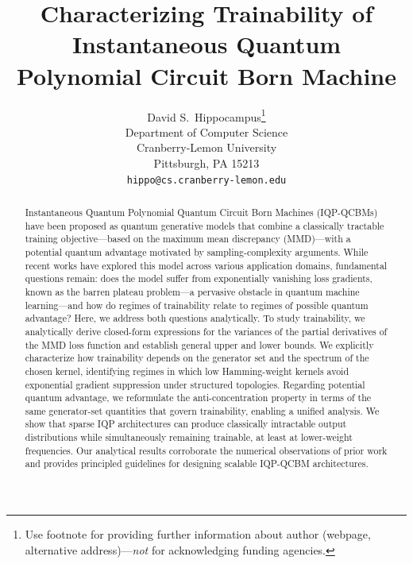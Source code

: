 \documentclass{article}
\title{Characterizing Trainability of Instantaneous Quantum Polynomial Circuit Born Machine}
\author{%
  David S.~Hippocampus\thanks{Use footnote for providing further information
    about author (webpage, alternative address)---\emph{not} for acknowledging
    funding agencies.} \\
  Department of Computer Science\\
  Cranberry-Lemon University\\
  Pittsburgh, PA 15213 \\
  \texttt{hippo@cs.cranberry-lemon.edu} \\
}
\theoremstyle{plain}
\theoremstyle{definition}
\theoremstyle{remark}
\begin{document}
\maketitle


\begin{abstract}
Instantaneous Quantum Polynomial Quantum Circuit Born Machines (IQP-QCBMs) have been proposed as quantum generative models that combine a classically tractable training objective—based on the maximum mean discrepancy (MMD)—with a potential quantum advantage motivated by sampling-complexity arguments. While recent works have explored this model across various application domains, fundamental questions remain: does the model suffer from exponentially vanishing loss gradients, known as the barren plateau problem—a pervasive obstacle in quantum machine learning—and how do regimes of trainability relate to regimes of possible quantum advantage? Here, we address both questions analytically. To study trainability, we analytically derive closed-form expressions for the variances of the partial derivatives of the MMD loss function and establish general upper and lower bounds. We explicitly characterize how trainability depends on the generator set and the spectrum of the chosen kernel, identifying regimes in which low Hamming-weight kernels avoid exponential gradient suppression under structured topologies. Regarding potential quantum advantage, we reformulate the anti-concentration property in terms of the same generator-set quantities that govern trainability, enabling a unified analysis. We show that sparse IQP architectures can produce classically intractable output distributions while simultaneously remaining trainable, at least at lower-weight frequencies. Our analytical results corroborate the numerical observations of prior work and provides principled guidelines for designing scalable IQP-QCBM architectures.
\end{abstract}
\end{document}
